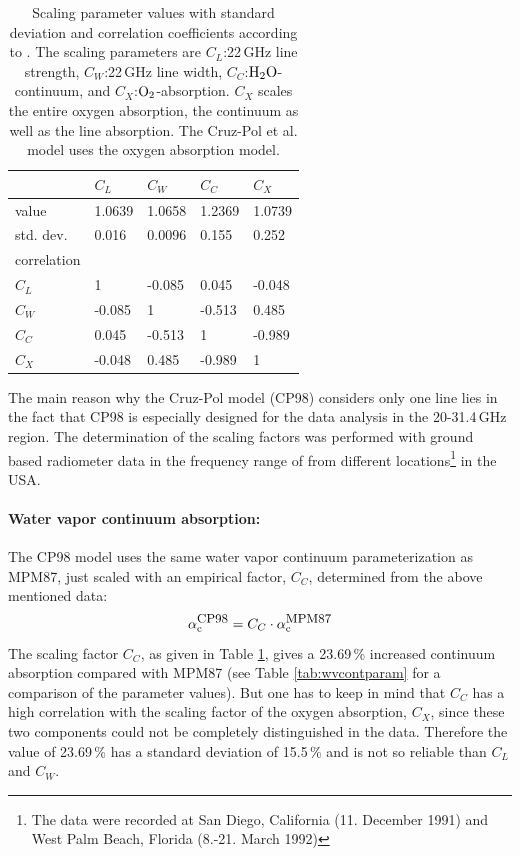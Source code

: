 \begin{table}[!htb]
\begin{center}
\begin{tabular}{lllll}
\hline
            & $C_L$ & $C_W$ & $C_C$ & $C_X$ \\
\hline
value       & 1.0639 & 1.0658 & 1.2369 & 1.0739\\
std. dev.   & 0.016  & 0.0096 & 0.155  & 0.252\\
\hline
correlation & &&&\\
$C_L$       & 1      & -0.085 & 0.045  & -0.048\\
$C_W$       & -0.085 & 1      & -0.513 &  0.485\\
$C_C$       & 0.045  & -0.513 & 1      & -0.989\\
$C_X$       & -0.048 & 0.485  & -0.989 & 1\\
\hline
\end{tabular}
\end{center}
\caption[CP98 scaling parameter values.]{Scaling parameter values with standard deviation and 
  correlation coefficients according to \citep{cruzpol:98}.
  The scaling parameters are $C_L$:22\,GHz line strength, 
  $C_W$:22\,GHz line width, $C_C$:$\mbox{H}_2\mbox{O}$-continuum, and 
  $C_X$:$\mbox{O}_2$-absorption. $C_X$ scales the entire oxygen absorption, 
  the continuum as well as the line absorption. The Cruz-Pol et al.
  model uses the \citet{pwr:93} oxygen absorption model.}
\label{tab:cp_orr}
\end{table}

The main reason why the Cruz-Pol model (CP98) considers only one line
lies in the fact that CP98 is especially designed for the data analysis
in the 20-31.4\,GHz region. The determination of the scaling factors was 
performed with ground based radiometer data in the frequency range of
from different locations\footnote{The data were recorded at San Diego, 
California (11. December 1991) and West Palm Beach, Florida 
(8.-21. March 1992)} in the USA.


\paragraph{Water vapor continuum absorption:}
\label{levele:cp98_h2ocont}
The CP98 model uses the same water vapor continuum 
parameterization as MPM87, just scaled with an empirical 
factor, $C_C$, determined from the above mentioned data:
\begin{equation}
 \label{eq:abs_theory:cp98_cont_scaling}
 \alpha^{\mbox{\rm \small CP98}}_{\rm c} = C_C \cdot \alpha^{\mbox{\rm \small MPM87}}_{\rm c} 
\end{equation}
The scaling factor $C_C$, as given in Table \ref{tab:cp_orr}, 
gives a 23.69\,\% increased continuum absorption compared 
with MPM87 (see Table \ref{tab:wvcontparam} for a comparison of the 
parameter values). But one has to keep in mind that $C_C$ has a 
high correlation with the scaling factor of the oxygen 
absorption, $C_X$, since these two components could not 
be completely distinguished in the data. Therefore the 
value of 23.69\,\% has a standard deviation of 15.5\,\% 
and is not so reliable than $C_L$ and $C_W$.






